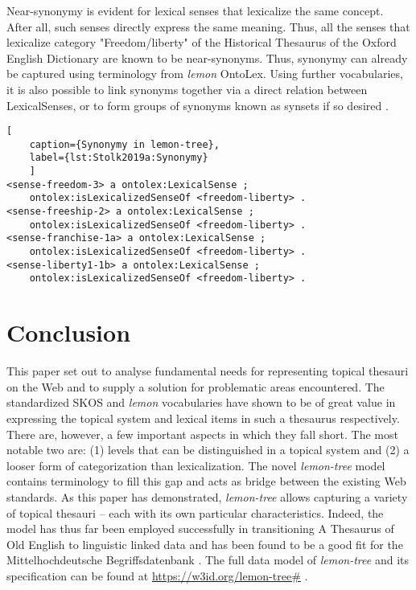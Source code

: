 Near-synonymy is evident for lexical senses that lexicalize the same concept. 
After all, such senses directly express the same meaning. 
Thus, all the senses that lexicalize category "Freedom/liberty" of the Historical Thesaurus of the Oxford English Dictionary are known to be near-synonyms. Thus, synonymy can already be captured using terminology from \emph{lemon} OntoLex. Using further vocabularies, it is also possible to link synonyms together via a direct relation between LexicalSenses, or to form groups of synonyms known as synsets if so desired \cite{ref-LEMON}. 

\noindent
\begin{minipage}[c]{\textwidth}
	\begin{lstlisting}[
	caption={Synonymy in lemon-tree},
	label={lst:Stolk2019a:Synonymy}
	]
<sense-freedom-3> a ontolex:LexicalSense ;
	ontolex:isLexicalizedSenseOf <freedom-liberty> .
<sense-freeship-2> a ontolex:LexicalSense ;
	ontolex:isLexicalizedSenseOf <freedom-liberty> .
<sense-franchise-1a> a ontolex:LexicalSense ;
	ontolex:isLexicalizedSenseOf <freedom-liberty> .
<sense-liberty1-1b> a ontolex:LexicalSense ;
	ontolex:isLexicalizedSenseOf <freedom-liberty> .
	\end{lstlisting}
\end{minipage}








\section{Conclusion}

This paper set out to analyse fundamental needs for representing topical thesauri on the Web and to supply a solution for problematic areas encountered. The standardized SKOS and \emph{lemon} vocabularies have shown to be of great value in expressing the topical system and lexical items in such a thesaurus respectively. There are, however, a few important aspects in which they fall short. The most notable two are: (1) levels that can be distinguished in a topical system and (2) a looser form of categorization than lexicalization. The novel \emph{lemon-tree} model contains terminology to fill this gap and acts as bridge between the existing Web standards. As this paper has demonstrated, \emph{lemon-tree} allows capturing a variety of topical thesauri -- each with its own particular characteristics. Indeed, the model has thus far been employed successfully in transitioning A Thesaurus of Old English \cite{ref-TOE} to linguistic linked data and has been found to be a good fit for the Mittelhochdeutsche Begriffsdatenbank \cite{ref-MHDBDB}. The full data model of \emph{lemon-tree} and its specification can be found at \url{https://w3id.org/lemon-tree#} .



%
%

